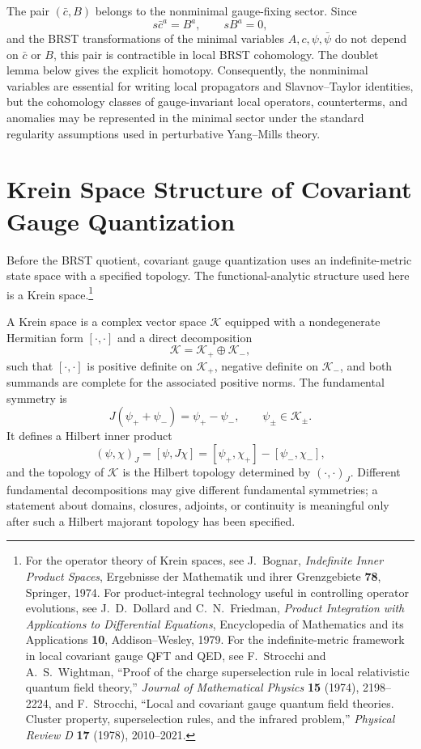 The pair \((\bar c,B)\) belongs to the nonminimal gauge-fixing sector.  Since
\[
  s\bar c^a=B^a,\qquad sB^a=0,
\]
and the BRST transformations of the minimal variables \(A,c,\psi,\bar\psi\) do
not depend on \(\bar c\) or \(B\), this pair is contractible in local BRST
cohomology.  The doublet lemma below gives the explicit homotopy.  Consequently,
the nonminimal variables are essential for writing local propagators and
Slavnov--Taylor identities, but the cohomology classes of gauge-invariant local
operators, counterterms, and anomalies may be represented in the minimal sector
under the standard regularity assumptions used in perturbative Yang--Mills
theory.

\section{Krein Space Structure of Covariant Gauge Quantization}

Before the BRST quotient, covariant gauge quantization uses an
indefinite-metric state space with a specified topology.  The
functional-analytic structure used here is a Krein space.\footnote{For the
operator theory of Krein spaces, see J.~Bognar,
\emph{Indefinite Inner Product Spaces}, Ergebnisse der Mathematik und ihrer
Grenzgebiete \textbf{78}, Springer, 1974.  For product-integral technology
useful in controlling operator evolutions, see J.~D.~Dollard and
C.~N.~Friedman, \emph{Product Integration with Applications to Differential
Equations}, Encyclopedia of Mathematics and its Applications \textbf{10},
Addison--Wesley, 1979.  For the indefinite-metric framework in local covariant
gauge QFT and QED, see F.~Strocchi and A.~S.~Wightman, ``Proof of the charge
superselection rule in local relativistic quantum field theory,''
\emph{Journal of Mathematical Physics} \textbf{15} (1974), 2198--2224, and
F.~Strocchi, ``Local and covariant gauge quantum field theories.  Cluster
property, superselection rules, and the infrared problem,'' \emph{Physical
Review D} \textbf{17} (1978), 2010--2021.}

\begin{definition}
A Krein space is a complex vector space \(\mathcal K\) equipped with a
nondegenerate Hermitian form \([\cdot,\cdot]\) and a direct decomposition
\[
  \mathcal K=\mathcal K_+\oplus\mathcal K_- ,
\]
such that \([\cdot,\cdot]\) is positive definite on \(\mathcal K_+\), negative
definite on \(\mathcal K_-\), and both summands are complete for the associated
positive norms.  The fundamental symmetry is
\[
  J(\psi_++\psi_-)=\psi_+-\psi_-,
  \qquad
  \psi_\pm\in\mathcal K_\pm .
\]
It defines a Hilbert inner product
\[
  (\psi,\chi)_J=[\psi,J\chi]
  =
  [\psi_+,\chi_+]-[\psi_-,\chi_-],
\]
and the topology of \(\mathcal K\) is the Hilbert topology determined by
\((\cdot,\cdot)_J\).  Different fundamental decompositions may give different
fundamental symmetries; a statement about domains, closures, adjoints, or
continuity is meaningful only after such a Hilbert majorant topology has been
specified.
\end{definition}

